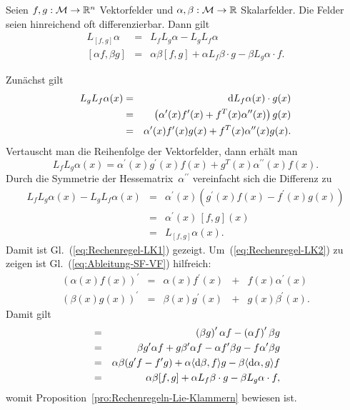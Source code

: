 \begin{proposition}
\label{pro:Rechenregeln-Lie-Klammern}Seien $f,g:\mathcal{M}\to{\mathbb{R}}^{n}$
Vektorfelder und $\alpha,\beta:\mathcal{M}\to{\mathbb{R}}$ Skalarfelder. Die
Felder seien hinreichend oft differenzierbar. Dann gilt \begin{subequations}\label{eq:Rechenregeln-Lie-Klammern}
\begin{eqnarray}
L_{[f,g]}\alpha & = & L_{f}L_{g}\alpha-L_{g}L_{f}\alpha\label{eq:Rechenregel-LK1}\\
{}[\alpha f,\beta g] & = & \alpha\beta[f,g]+\alpha L_{f}\beta\!\cdot\!g-\beta L_{g}\alpha\!\cdot\!f.\label{eq:Rechenregel-LK2}
\end{eqnarray}
\end{subequations}
\end{proposition}
\begin{svmultproof2}
Zunächst gilt 
\begin{eqnarray*}
L_{g}L_{f}\alpha(x) & = & {\mathrm{d}} L_{f}\alpha(x)\cdot g(x)\\
 & = & \left(\alpha^{\prime}(x)f^{\prime}(x)+f^{T}(x)\alpha^{\prime\prime}(x)\right)g(x)\\
 & = & \alpha^{\prime}(x)f^{\prime}(x)g(x)+f^{T}(x)\alpha^{\prime\prime}(x)g(x).
\end{eqnarray*}
Vertauscht man die Reihenfolge der Vektorfelder, dann erhält man 
\[
L_{f}L_{g}\alpha(x)=\alpha^{\prime}(x)g^{\prime}(x)f(x)+g^{T}(x)\alpha^{\prime\prime}(x)f(x).
\]
Durch die Symmetrie der Hessematrix~$\alpha^{\prime\prime}$ vereinfacht
sich die Differenz zu 
\begin{eqnarray*}
L_{f}L_{g}\alpha(x)-L_{g}L_{f}\alpha(x) & = & \alpha^{\prime}(x)\left(g^{\prime}(x)f(x)-f^{\prime}(x)g(x)\right)\\
 & = & \alpha^{\prime}(x)\,[f,g](x)\\
 & = & L_{[f,g]}\alpha(x).
\end{eqnarray*}
Damit ist Gl.~(\ref{eq:Rechenregel-LK1}) gezeigt. Um~(\ref{eq:Rechenregel-LK2})
zu zeigen ist Gl.~(\ref{eq:Ableitung-SF-VF}) hilfreich: 
\[
\begin{array}{rcccl}
\left(\alpha(x)f(x)\right)^{\prime} & = & \alpha(x)f^{\prime}(x) & + & f(x)\alpha^{\prime}(x)\\
\left(\beta(x)g(x)\right)^{\prime} & = & \beta(x)g^{\prime}(x) & + & g(x)\beta^{\prime}(x).
\end{array}
\]
Damit gilt 
\begin{eqnarray*}
[\alpha f,\beta g] & = & \left(\beta g\right)^{\prime}\alpha f-\left(\alpha f\right)^{\prime}\beta g\\
 & = & \beta g^{\prime}\alpha f+g\beta^{\prime}\alpha f-\alpha f^{\prime}\beta g-f\alpha^{\prime}\beta g\\
 & = & \alpha\beta(g^{\prime}f-f^{\prime}g)+\alpha\langle\d\beta,f\rangle g-\beta\langle\d\alpha,g\rangle f\\
 & = & \alpha\beta[f,g]+\alpha L_{f}\beta\cdot g-\beta L_{g}\alpha\cdot f,
\end{eqnarray*}
womit Proposition~\ref{pro:Rechenregeln-Lie-Klammern} bewiesen ist.
\end{svmultproof2}

